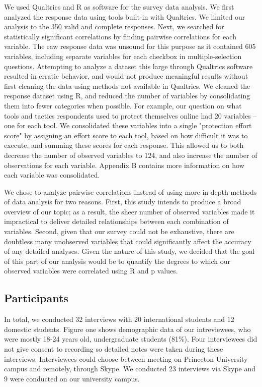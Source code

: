 We used Qualtrics and R as software for the survey data analysis. We first analyzed the
response data using tools built-in with Qualtrics. We limited our analysis to
the 350 valid and complete responses.  Next, we searched for statistically
significant correlations by finding pairwise correlations for each variable.
The raw response data was unsound for this purpose as it contained 605
variables, including separate variables for each checkbox in
multiple-selection questions. Attempting to analyze a dataset this large
through Qualtrics software resulted in erratic behavior, and would not produce
meaningful results without first cleaning the data using methods not available
in Qualtrics. We cleaned the response dataset using R, and reduced the number
of variables by consolidating them into fewer categories when possible. For
example, our question on what tools and tactics respondents used to protect
themselves online had 20 variables -- one for each tool. We consolidated these
variables into a single "protection effort score" by assigning an effort score
to each tool, based on how difficult it was to execute, and summing these
scores for each response. This allowed us to both decrease the number of
observed variables to 124, and also increase the number of observations for
each variable. Appendix B contains more information on how each variable was
consolidated.

We chose to analyze pairwise correlations instead of using more in-depth
methods of data analysis for two reasons. First, this study intends to produce
a broad overview of our topic; as a result, the sheer number of observed
variables made it impractical to deliver detailed relationships between each
combination of variables. Second, given that our survey could not be
exhaustive, there are doubtless many unobserved variables that could
significantly affect the accuracy of any detailed analyses. Given the nature
of this study, we decided that the goal of this part of our analysis would be
to quantify the degrees to which our observed variables were correlated using
R and p values.

\subsection{Participants} In total, we conducted 32 interviews with 20
international students and 12 domestic students. Figure one shows demographic data of our intreviewees, who were mostly 18-24 years old, undergraduate students (81\%). Four interviewees did not give consent to
recording so detailed notes were taken during these interviews. Interviewees
could choose between meeting on Princeton University campus and remotely,
through Skype. We conducted 23 interviews via Skype and 9 were conducted on our university campus.

